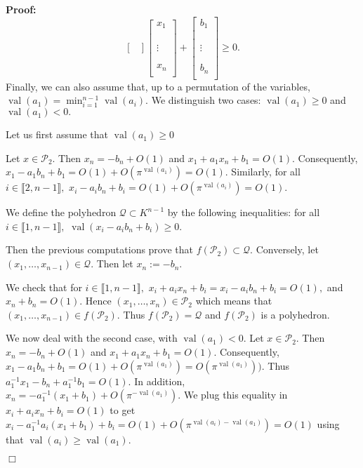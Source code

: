 \documentclass[a4paper,12pt]{article}
\newenvironment{proof}{\hbox{}\vspace{-0.5cm} {\bf Proof:}}{\hfill $\Box$ \\}
\newcommand{\PP}{\mathcal{P}}
\newcommand{\Qc}{\mathcal{Q}}
\DeclareMathOperator{\val}{val}
\begin{document}
\begin{proof}
\[\begin{bmatrix}
\end{bmatrix} \begin{bmatrix} x_1 \\ \\  \\ \\ \vdots \\  \\ \\ x_n \\ \end{bmatrix} + \begin{bmatrix} b_1 \\ \\ \\  \\ \vdots  \\ \\ \\ b_n \\ \end{bmatrix}  \geq 0.\]
Finally, we can also assume that, up to a permutation of the variables, $\val(a_1)= \min_{i=1}^{n-1} \val(a_i).$
We distinguish two cases: $\val(a_1) \geq 0$ and $\val(a_1)<0.$

Let us first assume that $\val(a_1) \geq 0$

Let $x \in \PP_2$.
Then $x_n=-b_n+O(1)$
and $x_1+a_1 x_n+b_1=O(1).$
Consequently, $x_1-a_1 b_n +b_1=O(1)+O(\pi^{\val(a_1)})=O(1).$
Similarly, for all $i \in \llbracket 2,n-1 \rrbracket,$
$x_i-a_ib_n+b_i=O(1)+O(\pi^{\val(a_i)})=O(1).$

We define the polyhedron $\Qc \subset K^{n-1}$ by the following inequalities:
 for all $i \in \llbracket 1,n-1 \rrbracket,$
$\val(x_i-a_ib_n+b_i) \geq 0.$

Then the previous computations prove that $f(\PP_2)\subset \Qc.$
Conversely, let $(x_1,\dots,x_{n-1}) \in \Qc.$
Then let $x_n := -b_n.$

We check that for $i \in \llbracket 1,n-1 \rrbracket,$
$x_i+a_ix_n+b_i=x_i-a_ib_n+b_i=O(1),$
and $x_n+b_n=O(1)$. Hence $(x_1,\dots,x_n) \in \PP_2$
which means that $(x_1,\dots,x_{n-1}) \in f(\PP_2).$
Thus $f(\PP_2)= \Qc$ and $f(\PP_2)$ is a polyhedron.

We now deal with the second case, with $\val(a_1)<0.$
Let $x \in \PP_2$.
Then $x_n=-b_n+O(1)$
and $x_1+a_1 x_n+b_1=O(1).$
Consequently, $x_1-a_1 b_n +b_1=O(1)+O(\pi^{\val(a_1)})=O(\pi^{\val(a_1)})).$
Thus $a_1^{-1}x_1- b_n +a_1^{-1}b_1=O(1)$.
In addition, $x_n=-a_1^{-1}(x_1+b_1)+O(\pi^{-\val(a_1)}).$
We plug this equality in 
$x_i+a_i x_n+b_i=O(1)$ to get
$x_i-a_1^{-1}a_i(x_1+b_1)+b_i=O(1)+O(\pi^{\val(a_i)-\val(a_1)})=O(1)$
using that $\val(a_i) \geq \val (a_1).$


\end{proof}
\end{document}
